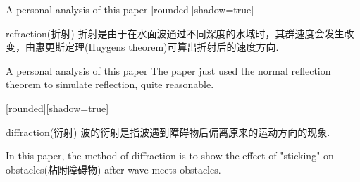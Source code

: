 \documentclass{beamer}
\begin{document}
\begin{frame}{A personal analysis of this paper}
  [rounded][shadow=true]
  \begin{block}{refraction(折射)}
    折射是由于在水面波通过不同深度的水域时，其群速度会发生改变，由惠更斯定理(Huygens theorem)可算出折射后的速度方向.
  \end{block}
  
  \begin{figure}[thpb]
    \centering
  \label{fig:system}
  \end{figure}
\end{frame}
\begin{frame}{A personal analysis of this paper}
  The paper just used the normal reflection theorem to simulate reflection, quite reasonable.
  
  [rounded][shadow=true]
  \begin{block}{diffraction(衍射)}
    波的衍射是指波遇到障碍物后偏离原来的运动方向的现象.
  \end{block}
  In this paper, the method of diffraction is to show the effect of "sticking" on obstacles(粘附障碍物) after wave meets obstacles.
\end{frame}
\end{document}
